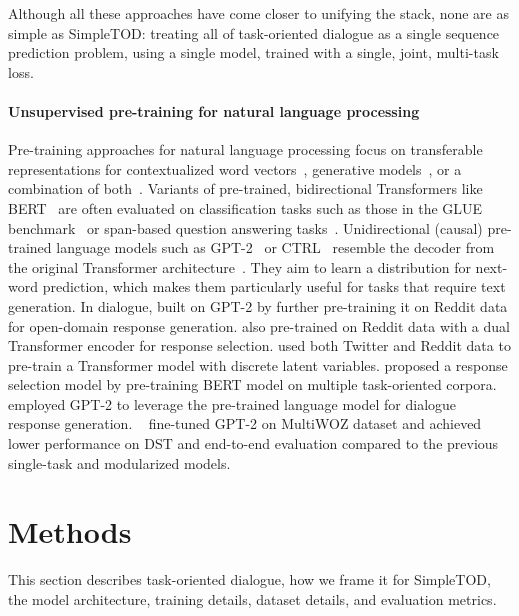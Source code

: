 \documentclass{article}
\begin{document}
Although all these approaches have come closer to unifying the stack, 
none are as simple as SimpleTOD: 
treating all of task-oriented dialogue as a single sequence prediction problem, 
using a single model, 
trained with a single, joint, multi-task loss.


\paragraph{Unsupervised pre-training for natural language processing}
Pre-training approaches for natural language processing focus on transferable representations 
for contextualized word vectors~\citep{mccann2017learned,peters2018deep}, 
generative models~\citep{radford2019language,keskar2019ctrl}, 
or a combination of both~\citep{dong2019unified,yang2019xlnet}.
Variants of pre-trained, bidirectional Transformers like BERT~\citep{devlin2018bert} 
are often evaluated on classification tasks such as those in the GLUE benchmark~\citep{wang2018glue} 
or span-based question answering tasks~\citep{rajpurkar2016squad}. 
Unidirectional (causal) pre-trained language models 
such as GPT-2~\citep{radford2019language} or CTRL~\citep{keskar2019ctrl} 
resemble the decoder from the original Transformer architecture~\citep{vaswani2017attention}.
They aim to learn a distribution for next-word prediction, 
which makes them particularly useful for tasks that require text generation.
In dialogue,
\citet{zhang2019dialogpt} built on GPT-2 by further pre-training it on Reddit data 
for open-domain response generation. 
\citet{henderson2019convert} also pre-trained on Reddit data with a dual Transformer encoder 
for response selection. 
\citet{bao2019plato} used both Twitter and Reddit data to pre-train a Transformer model 
with discrete latent variables. 
\citet{wu2020tod} proposed a response selection model 
by pre-training BERT model on multiple task-oriented corpora.
~\citet{budzianowski2019hello} employed GPT-2 to leverage the pre-trained language model for dialogue response generation.
~\citet{ham2020end} fine-tuned GPT-2 on MultiWOZ dataset and achieved lower performance on DST and end-to-end evaluation compared to the previous single-task and modularized models. 
\section{Methods}
\label{sec:methods}




This section describes task-oriented dialogue, how we frame it for SimpleTOD, the model architecture, training details, dataset details, and evaluation metrics.
\end{document}
